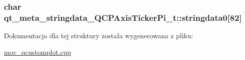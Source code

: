 \subsubsection[{\texorpdfstring{stringdata0}{stringdata0}}]{\setlength{\rightskip}{0pt plus 5cm}char qt\+\_\+meta\+\_\+stringdata\+\_\+\+Q\+C\+P\+Axis\+Ticker\+Pi\+\_\+t\+::stringdata0\mbox{[}82\mbox{]}}\hypertarget{structqt__meta__stringdata___q_c_p_axis_ticker_pi__t_a09df8d6e526c01eb8d476aad32b2ab37}{}\label{structqt__meta__stringdata___q_c_p_axis_ticker_pi__t_a09df8d6e526c01eb8d476aad32b2ab37}


Dokumentacja dla tej struktury została wygenerowana z pliku\+:\begin{DoxyCompactItemize}
\item 
\hyperlink{moc__qcustomplot_8cpp}{moc\+\_\+qcustomplot.\+cpp}\end{DoxyCompactItemize}
